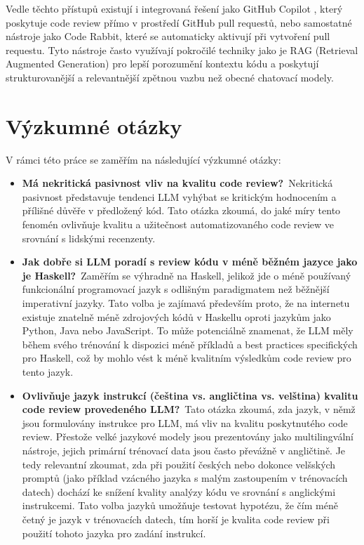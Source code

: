 \documentclass[12pt, a4paper]{article}
\begin{document}
Vedle těchto přístupů existují i integrovaná řešení jako GitHub Copilot \cite{copilot2023}, který poskytuje code review přímo v prostředí GitHub pull requestů, nebo samostatné nástroje jako Code Rabbit, které se automaticky aktivují při vytvoření pull requestu. Tyto nástroje často využívají pokročilé techniky jako je RAG (Retrieval Augmented Generation) pro lepší porozumění kontextu kódu a poskytují strukturovanější a relevantnější zpětnou vazbu než obecné chatovací modely.


\section{Výzkumné otázky}
V rámci této práce se zaměřím na následující výzkumné otázky:
\begin{itemize}
\item \textbf{Má nekritická pasivnost vliv na kvalitu code review?}\
Nekritická pasivnost představuje tendenci LLM vyhýbat se kritickým hodnocením a přílišné důvěře v předložený kód. Tato otázka zkoumá, do jaké míry tento fenomén ovlivňuje kvalitu a užitečnost automatizovaného code review ve srovnání s lidskými recenzenty.
\item \textbf{Jak dobře si LLM poradí s review kódu v méně běžném jazyce jako je Haskell?}\
Zaměřím se výhradně na Haskell, jelikož jde o méně používaný funkcionální programovací jazyk s odlišným paradigmatem než běžnější imperativní jazyky. Tato volba je zajímavá především proto, že na internetu existuje znatelně méně zdrojových kódů v Haskellu oproti jazykům jako Python, Java nebo JavaScript. To může potenciálně znamenat, že LLM měly během svého trénování k dispozici méně příkladů a best practices specifických pro Haskell, což by mohlo vést k méně kvalitním výsledkům code review pro tento jazyk.
\item \textbf{Ovlivňuje jazyk instrukcí (čeština vs. angličtina vs. velština) kvalitu code review provedeného LLM?}\
Tato otázka zkoumá, zda jazyk, v němž jsou formulovány instrukce pro LLM, má vliv na kvalitu poskytnutého code review. Přestože velké jazykové modely jsou prezentovány jako multilingvální nástroje, jejich primární trénovací data jsou často převážně v angličtině. Je tedy relevantní zkoumat, zda při použití českých nebo dokonce velšských promptů (jako příklad vzácného jazyka s malým zastoupením v trénovacích datech) dochází ke snížení kvality analýzy kódu ve srovnání s anglickými instrukcemi. Tato volba jazyků umožňuje testovat hypotézu, že čím méně četný je jazyk v trénovacích datech, tím horší je kvalita code review při použití tohoto jazyka pro zadání instrukcí.

\end{itemize}
\end{document}
